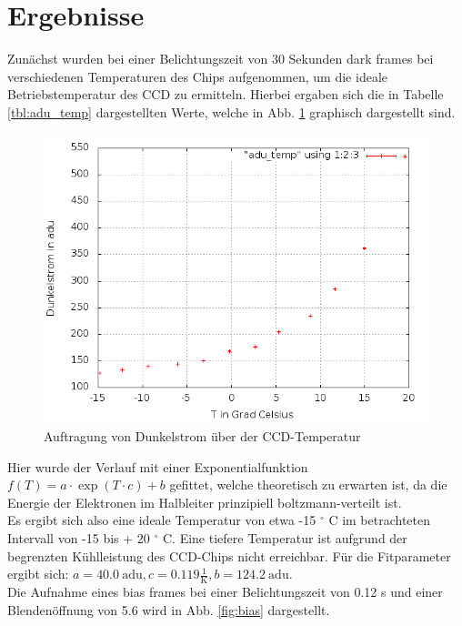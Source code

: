 \section{Ergebnisse}
Zunächst wurden bei einer Belichtungszeit von 30 Sekunden dark frames bei verschiedenen Temperaturen des Chips aufgenommen, um die ideale Betriebstemperatur des CCD zu ermitteln. Hierbei ergaben sich die in Tabelle \ref{tbl:adu_temp} dargestellten Werte, welche in Abb. \ref{fig:adu_temp} graphisch dargestellt sind. 
\begin{figure}[h!]
        \includegraphics[width=.9\textwidth]{plot_adu_temp.png}
\caption{ Auftragung von Dunkelstrom über der CCD-Temperatur }
\label{fig:adu_temp}
\end{figure}
Hier wurde der Verlauf mit einer Exponentialfunktion $f(T) = a \cdot \exp(T \cdot c) + b$ gefittet, welche theoretisch zu erwarten ist, da die Energie der Elektronen im Halbleiter prinzipiell boltzmann-verteilt ist. \\
Es ergibt sich also eine ideale Temperatur von etwa -15 $^\circ$ C im betrachteten Intervall von -15 bis + 20 $^\circ$ C. Eine tiefere Temperatur ist aufgrund der begrenzten Kühlleistung des CCD-Chips nicht erreichbar. Für die Fitparameter ergibt sich: 
$a = 40.0\  \mathrm{adu}, c = 0.119 \frac{1}{\mathrm{K}}, b = 124.2 \ \mathrm{adu}$. \\
Die Aufnahme eines bias frames bei einer Belichtungszeit von 0.12 s und einer Blendenöffnung von 5.6 wird in Abb. \ref{fig:bias} dargestellt. 
